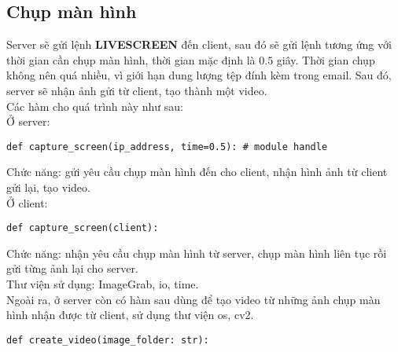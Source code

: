 \subsection{Chụp màn hình}
Server sẽ gửi lệnh \textbf{LIVESCREEN} đến client, sau đó sẽ gửi lệnh tương ứng với thời gian cần chụp màn hình, thời gian mặc định là $0.5$ giây. Thời gian chụp không nên quá nhiều, vì giới hạn dung lượng tệp đính kèm trong email. Sau đó, server sẽ nhận ảnh gửi từ client, tạo thành một video.\\
Các hàm cho quá trình này như sau:\\
Ở server:
\begin{lstlisting}
def capture_screen(ip_address, time=0.5): # module handle
\end{lstlisting}
Chức năng: gửi yêu cầu chụp màn hình đến cho client, nhận hình ảnh từ client gửi lại, tạo video.\\
Ở client:
\begin{lstlisting}
def capture_screen(client):
\end{lstlisting}
Chức năng: nhận yêu cầu chụp màn hình từ server, chụp màn hình liên tục rồi gửi từng ảnh lại cho server.\\
Thư viện sử dụng: ImageGrab, io, time.\\
Ngoài ra, ở server còn có hàm sau dùng để tạo video từ những ảnh chụp màn hình nhận được từ client, sử dụng thư viện os, cv2.
\begin{lstlisting}
def create_video(image_folder: str):
\end{lstlisting}